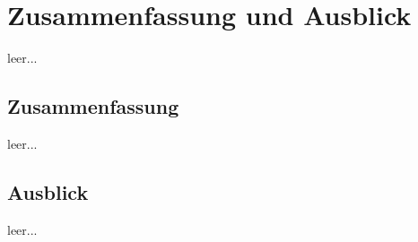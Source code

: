 \chapter{Zusammenfassung und Ausblick} 
\label{ch:ende}
leer...
\section{Zusammenfassung}
leer...
\section{Ausblick}
leer...
